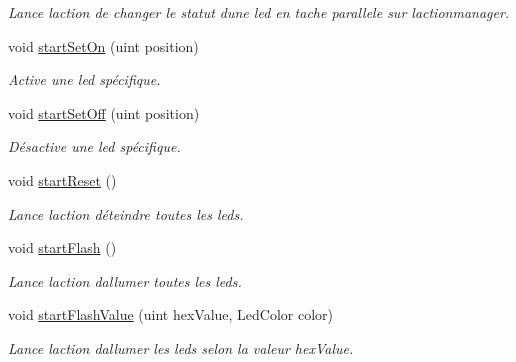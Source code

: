 \begin{DoxyCompactItemize}
\begin{DoxyCompactList}\small\item\em Lance l\textquotesingle{}action de changer le statut d\textquotesingle{}une led en tache parallele sur l\textquotesingle{}actionmanager. \end{DoxyCompactList}\item 
void \hyperlink{classLedBar_af2eb11c44122b3206a657eb3b0b6f05e}{start\+Set\+On} (uint position)
\begin{DoxyCompactList}\small\item\em Active une led spécifique. \end{DoxyCompactList}\item 
void \hyperlink{classLedBar_ad37f92ef4b6487afc785d739a59a32aa}{start\+Set\+Off} (uint position)
\begin{DoxyCompactList}\small\item\em Désactive une led spécifique. \end{DoxyCompactList}\item 
\mbox{\label{classLedBar_a77df047f6a8fadf44a3d24d51eb27f68}} 
void \hyperlink{classLedBar_a77df047f6a8fadf44a3d24d51eb27f68}{start\+Reset} ()
\begin{DoxyCompactList}\small\item\em Lance l\textquotesingle{}action d\textquotesingle{}éteindre toutes les leds. \end{DoxyCompactList}\item 
\mbox{\label{classLedBar_a76595197ac9045d04f108bed1f3ac4fd}} 
void \hyperlink{classLedBar_a76595197ac9045d04f108bed1f3ac4fd}{start\+Flash} ()
\begin{DoxyCompactList}\small\item\em Lance l\textquotesingle{}action d\textquotesingle{}allumer toutes les leds. \end{DoxyCompactList}\item 
\mbox{\label{classLedBar_a714ebd39a178ddd3d602deed7af0bf56}} 
void \hyperlink{classLedBar_a714ebd39a178ddd3d602deed7af0bf56}{start\+Flash\+Value} (uint hex\+Value, Led\+Color color)
\begin{DoxyCompactList}\small\item\em Lance l\textquotesingle{}action d\textquotesingle{}allumer les leds selon la valeur hex\+Value. \end{DoxyCompactList}\item 

\end{DoxyCompactItemize}
